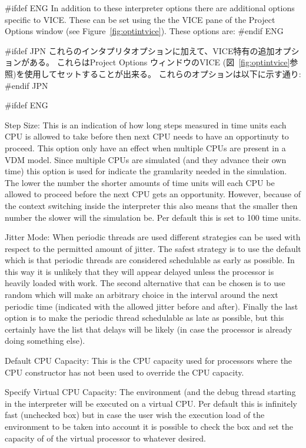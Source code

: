 \documentclass[\pformat,12pt]{article}
\newcommand{\guicmd}[1]{{\sf #1}}
\newcommand{\guicmd}[1]{{\gt #1}}
\begin{document}
#ifdef ENG
In addition to these interpreter options there are additional options
specific to VICE. These can be set using the the 
\guicmd{VICE} pane of the \guicmd{Project Options} window (see
Figure~\ref{fig:optintvice}). These options are:
#endif ENG

#ifdef JPN
これらのインタプリタオプションに加えて、VICE特有の追加オプションがある。
これらは\guicmd{Project Options} ウィンドウの\guicmd{VICE} 
(図~\ref{fig:optintvice}参照)を使用してセットすることが出来る。
これらのオプションは以下に示す通り:
#endif JPN

\begin{list}{}{}
#ifdef ENG
\item[{\sf Step Size}:] This is an indication of how long steps
measured in time units each CPU is allowed to take before then next
CPU needs to have an opportinuty to proceed. This option only have an
effect when multiple CPUs are present in a VDM model. Since multiple
CPUs are simulated (and they advance their own time) this option is
used for indicate the granularity needed in the simulation. The lower
the number the shorter amounts of time units will each CPU be allowed
to proceed before the next CPU gets an opportunity. However, because
of the context switching inside the interpreter this also means that
the smaller then number the slower will the simulation be. Per default
this is set to 100 time units.

\item[{\sf Jitter Mode}:] When periodic threads are used different
strategies can be used with respect to the permitted amount of
jitter. The safest strategy is to use the default which is that
periodic threads are considered schedulable as {\sf early} as
possible. In this way it is unlikely that they will appear delayed
unless the processor is heavily loaded with work. The second
alternative that can be chosen is to use {\sf random} which will make
an arbitrary choice in the interval around the next periodic time
(indicated with the allowed jitter before and after). Finally the last
option is to make the periodic thread schedulable as {\sf late} as
possible, but this certainly have the list that delays will be likely
(in case the processor is already doing something else).

\item[{\sf Default CPU Capacity}:] This is the CPU capacity used for
processors where the CPU constructor has not been used to override the
CPU capacity. 

\item[{\sf Specify Virtual CPU Capacity}:] The environment (and the
debug thread starting in the interpreter will be executed on a virtual
CPU. Per default this is infinitely fast (unchecked box) but in case
the user wish the execution load of the environment to be taken into
account it is possible to check the box and set the capacity of of the
virtual processor to whatever desired. 


\end{list}
\end{document}
